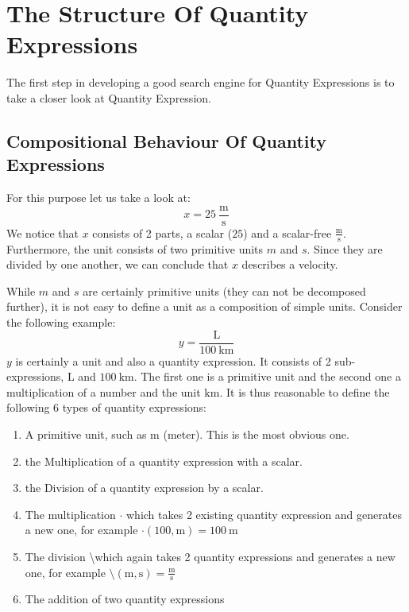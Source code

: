 \section{The Structure Of Quantity Expressions}
\label{sec:strucqe}

The first step in developing a good search engine for Quantity Expressions is to take a closer look at Quantity Expression. 

\subsection{Compositional Behaviour Of Quantity Expressions}
For this purpose let us take a look at:
\[x = 25\ \frac{\text{m}}{\text{s}}\]
We notice that $x$ consists of 2 parts, a scalar ($25$) and a scalar-free $\frac{\text{m}}{\text{s}}$. Furthermore, the unit consists of two primitive units $m$ and $s$. Since they are divided by one another, we can conclude that $x$ describes a velocity.

While $m$ and $s$ are certainly primitive units (they can not be decomposed further), it is not easy to define a unit as a composition of simple units. Consider the following example:
\[y = \frac{\text{L}}{100\ \text{km}}\]
$y$ is certainly a unit and also a quantity expression. It consists of 2 sub-expressions, $\text{L}$ and $100\ \text{km}$. The first one is a primitive unit and the second one a multiplication of a number and the unit $\text{km}$. It is thus reasonable to define the following 6 types of quantity expressions:
\begin{enumerate}
  \item A primitive unit, such as $\text{m}$ (meter). This is the most obvious one.
  \item the Multiplication of a quantity expression with a scalar.
  \item the Division of a quantity expression by a scalar.
  \item The multiplication $\cdot{}$ which takes 2 existing quantity expression and generates a new one, for example $\cdot \left(100, \text{m} \right) = 100\ \text{m}$
  \item The division \textbackslash which again takes 2 quantity expressions and generates a new one, for example $\text{\textbackslash} (\text{m}, \text{s}) = \frac{\text{m}}{\text{s}}$
  \item The addition of two quantity expressions
\end{enumerate}

